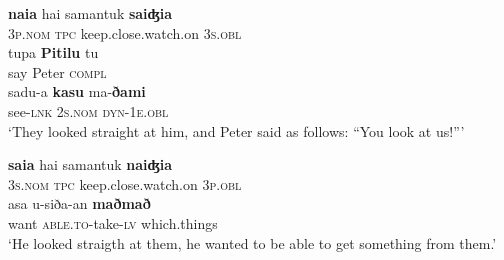 \documentclass[output=paper
,modfonts
,nonflat]{langsci/langscibook}
\begin{document}
\begin{exe}
	\label{tx3-4}
	\begin{xlist}
		\ex\label{tx3-4a}
		\gll \textbf{naia}  hai  samantuk  \textbf{saiʤia}\\
		\textsc{3p}.\textsc{nom}  \textsc{tpc}  keep.close.watch.on  \textsc{3s}.\textsc{obl}\\
		\ex\label{tx3-4b}
		\gll tupa  \textbf{Pitilu}  tu\\
		say  Peter  \textsc{compl}\\
		\ex\label{tx3-4c}
		\gll sadu-a  \textbf{kasu}  ma-\textbf{ðami}\\
		see-\textsc{lnk}  \textsc{2s}.\textsc{nom}  \textsc{dyn}-\textsc{1e}.\textsc{obl}\\
		\glt `They looked straight at him, and Peter said as follows: “You look at us!”’
	\end{xlist}
\end{exe}

\begin{exe}
	\label{tx3-5}
	\begin{xlist}
		\ex\label{tx3-5a}
		\gll \textbf{saia}  hai  samantuk  \textbf{naiʤia}\\
		\textsc{3s.nom}  \textsc{tpc}  keep.close.watch.on  \textsc{3p.obl}\\
		\ex\label{tx3-5b}
		\gll asa  u-siða-an  \textbf{maðmað}\\
		want  \textsc{able.to}-take-\textsc{lv}  which.things\\
		\glt `He looked straigth at them, he wanted to be able to get something from them.’
	\end{xlist}
\end{exe}
\end{document}

